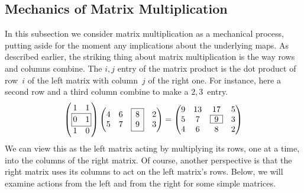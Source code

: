\subsection{Mechanics of Matrix Multiplication}
In this subsection we consider matrix multiplication as a mechanical process, 
putting aside for the moment any implications about the underlying maps.
As described earlier,
the striking thing about matrix multiplication is the
way rows and columns combine.
The \( i,j \) entry of the matrix product is the dot product of
row~$i$ of the left matrix with column~$j$
of the right one.
For instance,
here a second row and a third column combine to make a $2,3$~entry.
\begin{equation*}
\setlength{\fboxsep}{1.5pt}
    \begin{pmatrix}
       \begin{array}{@{}cc@{}} 1  &1 \end{array}                         \\ 
       \text{\fbox{\( \begin{array}{@{}cc@{}}  0  &1  \end{array} \)}}   \\  
       \begin{array}{@{}cc@{}} 1  &0 \end{array}
    \end{pmatrix}
    \begin{pmatrix}
      \begin{array}{@{}c@{}}  4  \\  5  \end{array}
      &\begin{array}{@{}c@{}}  6  \\  7  \end{array}
      &\text{\fbox{ \(\begin{array}{@{}c@{}}  8  \\  9  \end{array}\) }}
      &\begin{array}{@{}c@{}}  2  \\  3  \end{array}
    \end{pmatrix}
  =
    \begin{pmatrix}
      9  &13   &17                      &5  \\
      5  &7    &\text{\fbox{ \(9\) }}   &3  \\
      4  &6    &8                       &2
    \end{pmatrix}
\end{equation*}
We can view this as the left matrix acting
by multiplying its rows, one at a time, into the columns of the right matrix.
Of course, another perspective 
is that the right matrix uses its columns to
act on the left matrix's rows.
Below, we will examine actions from the left and from the right for some
simple matrices.

